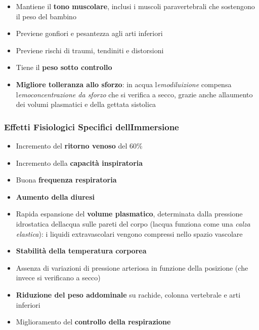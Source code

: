 \documentclass[a4paper,11pt]{article}
\providecommand{\tightlist}{%
  \setlength{\itemsep}{0pt}\setlength{\parskip}{0pt}}
\begin{document}
\begin{itemize}
      \tightlist
      \item
            Mantiene il \textbf{tono muscolare}, inclusi i muscoli paravertebrali
            che sostengono il peso del bambino
      \item
            Previene gonfiori e pesantezza agli arti inferiori
      \item
            Previene rischi di traumi, tendiniti e distorsioni
      \item
            Tiene il \textbf{peso sotto controllo}
      \item
            \textbf{Migliore tolleranza allo sforzo}: in acqua
            l\textquotesingle{}\emph{emodiluizione} compensa
            l\textquotesingle{}\emph{emoconcentrazione da sforzo} che si verifica
            a secco, grazie anche all\textquotesingle aumento dei volumi
            plasmatici e della gettata sistolica
\end{itemize}

\subsubsection{Effetti Fisiologici Specifici
      dell\textquotesingle Immersione}\label{effetti-fisiologici-specifici-dellimmersione}

\begin{itemize}
      \tightlist
      \item
            Incremento del \textbf{ritorno venoso} del 60\%
      \item
            Incremento della \textbf{capacità inspiratoria}
      \item
            Buona \textbf{frequenza respiratoria}
      \item
            \textbf{Aumento della diuresi}
      \item
            Rapida espansione del \textbf{volume plasmatico}, determinata dalla
            pressione idrostatica dell\textquotesingle acqua sulle pareti del
            corpo (l\textquotesingle acqua funziona come una \emph{calza
                  elastica}): i liquidi extravascolari vengono compressi nello spazio
            vascolare
      \item
            \textbf{Stabilità della temperatura corporea}
      \item
            Assenza di variazioni di pressione arteriosa in funzione della
            posizione (che invece si verificano a secco)
      \item
            \textbf{Riduzione del peso addominale} su rachide, colonna vertebrale
            e arti inferiori
      \item
            Miglioramento del \textbf{controllo della respirazione}
\end{itemize}
\end{document}
